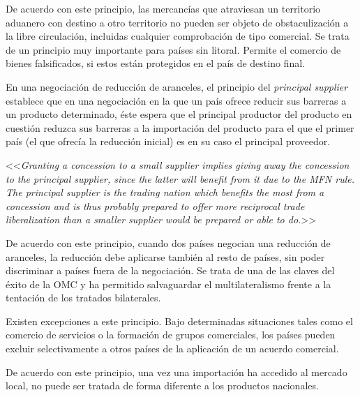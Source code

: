 \documentclass{nuevotema}
\begin{document}

De acuerdo con este principio, las mercancías que atraviesan un territorio aduanero con destino a otro territorio no pueden ser objeto de obstaculización a la libre circulación, incluidas cualquier comprobación de tipo comercial. Se trata de un principio muy importante para países sin litoral. Permite el comercio de bienes falsificados, si estos están protegidos en el país de destino final.


En una negociación de reducción de aranceles, el principio del \textit{principal supplier} establece que en una negociación en la que un país ofrece reducir sus barreras a un producto determinado, éste espera que el principal productor del producto en cuestión reduzca sus barreras a la importación del producto para el que el primer país (el que ofrecía la reducción inicial) es en su caso el principal proveedor.

<<\textit{Granting a concession to a small supplier implies giving away the
	concession to the principal supplier, since the latter will benefit from
	it due to the MFN rule. The principal supplier is the trading nation
	which benefits the most from a concession and is thus probably
	prepared to offer more reciprocal trade liberalization than a smaller
	supplier would be prepared or able to do.}>>



De acuerdo con este principio, cuando dos países negocian una reducción de aranceles, la reducción debe aplicarse también al resto de países, sin poder discriminar a países fuera de la negociación. Se trata de una de las claves del éxito de la OMC y ha permitido salvaguardar el multilateralismo frente a la tentación de los tratados bilaterales.

Existen excepciones a este principio. Bajo determinadas situaciones tales como el comercio de servicios o la formación de grupos comerciales, los países pueden excluir selectivamente a otros países de la aplicación de un acuerdo comercial.


De acuerdo con este principio, una vez una importación ha accedido al mercado local, no puede ser tratada de forma diferente a los productos nacionales.
\end{document}
